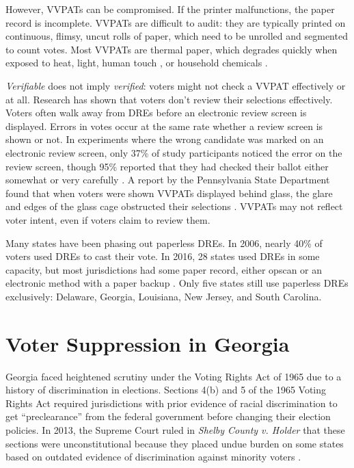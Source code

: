 \documentclass[runningheads]{llncs}
\begin{document}
However, VVPATs can be compromised.
If the printer malfunctions, the paper record is incomplete.
VVPATs are difficult to audit: 
they are typically printed on continuous, flimsy, uncut rolls of paper, which need
to be unrolled and segmented to count votes.
Most VVPATs are thermal paper, which degrades quickly when exposed
to heat, light, human touch \cite{nist_auditability_2015}, or household chemicals \cite{TTBR07}.

\emph{Verifiable} does not imply \emph{verified}:
voters might not check a VVPAT effectively or at all.
Research has shown that voters don't review their selections effectively.
Voters often walk away from DREs before an electronic review screen is displayed.
Errors in votes occur at the same rate whether a review screen is shown or not.
In experiments where the wrong candidate was marked on an electronic review screen, 
only 37\% of study participants noticed the error on the review screen,
though 95\% reported that they had checked their ballot either somewhat or very carefully \cite{everett_usability_2007}.
A report by the Pennsylvania State Department found that when voters were shown VVPATs displayed behind glass, the glare and edges of the glass cage obstructed their selections \cite{penn_sos_2018}.
VVPATs may not reflect voter intent, even if voters claim to review them.

Many states have been phasing out paperless DREs.
In 2006, nearly 40\% of voters used DREs to cast their vote.
In 2016, 28 states used DREs in some capacity, 
but most jurisdictions had some paper record, either opscan or an electronic method with a paper backup \cite{wofford_how_2016}. 
Only five states still use paperless DREs exclusively: 
Delaware, Georgia, Louisiana, New Jersey, and South Carolina.

\section{Voter Suppression in Georgia}

Georgia faced heightened scrutiny under the Voting Rights Act of 1965
due to a history of discrimination in elections.
Sections 4(b) and 5 of the 1965 Voting Rights Act required jurisdictions with prior evidence of racial discrimination to get ``preclearance''
from the federal government before changing their election policies.
In 2013, the Supreme Court ruled in \emph{Shelby County v. Holder}
that these sections
were unconstitutional because they placed undue burden on some states based on outdated evidence of 
discrimination against minority voters \cite{shelby_holder_2013}.
\end{document}
